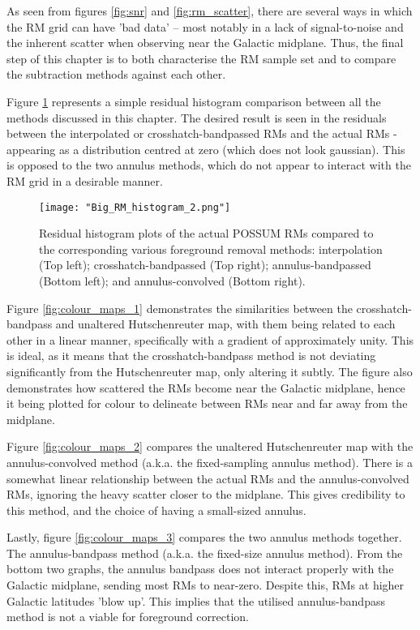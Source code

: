 As seen from figures \ref{fig:snr} and \ref{fig:rm_scatter}, there are several ways in which the RM grid can have 'bad data' – most notably in a lack of signal-to-noise and the inherent scatter when observing near the Galactic midplane. Thus, the final step of this chapter is to both characterise the RM sample set and to compare the subtraction methods against each other.


Figure \ref{fig:big_hist} represents a simple residual histogram comparison between all the methods discussed in this chapter. The desired result is seen in the residuals between the interpolated or crosshatch-bandpassed RMs and the actual RMs - appearing as a distribution centred at zero (which does not look gaussian).  This is opposed to the two annulus methods, which do not appear to interact with the RM grid in a desirable manner.

\begin{figure}
    \texttt{[image: "Big\_RM\_histogram\_2.png"]}
    \centering
    \caption{Residual histogram plots of the actual POSSUM RMs compared to the corresponding various foreground removal methods: interpolation (Top left); crosshatch-bandpassed (Top right); annulus-bandpassed (Bottom left); and annulus-convolved (Bottom right).}
    \label{fig:big_hist}
\end{figure}


Figure \ref{fig:colour_maps_1} demonstrates the similarities between the crosshatch-bandpass and unaltered Hutschenreuter map, with them being related to each other in a linear manner, specifically with a gradient of approximately unity. This is ideal, as it means that the crosshatch-bandpass method is not deviating significantly from the Hutschenreuter map, only altering it subtly. The figure also demonstrates how scattered the RMs become near the Galactic midplane, hence it being plotted for colour to delineate between RMs near and far away from the midplane.


Figure \ref{fig:colour_maps_2} compares the unaltered Hutschenreuter map with the annulus-convolved method (a.k.a. the fixed-sampling annulus method). There is a somewhat linear relationship between the actual RMs and the annulus-convolved RMs, ignoring the heavy scatter closer to the midplane. This gives credibility to this method, and the choice of having a small-sized annulus.


Lastly, figure \ref{fig:colour_maps_3} compares the two annulus methods together. The annulus-bandpass method (a.k.a. the fixed-size annulus method). From the bottom two graphs, the annulus bandpass does not interact properly with the Galactic midplane, sending most RMs to near-zero. Despite this, RMs at higher Galactic latitudes 'blow up'. This implies that the utilised annulus-bandpass method is not a viable for foreground correction.

